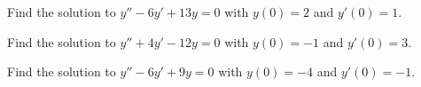 \documentclass{ximera}
\begin{document}
\begin{exercise}
    Find the solution to $y'' - 6y' + 13y = 0$ with $y(0) = 2$ and $y'(0) = 1$. 
\end{exercise}

\begin{exercise}
    Find the solution to $y'' + 4y' - 12y = 0$ with $y(0) = -1$ and $y'(0) = 3$. 
\end{exercise}

\begin{exercise}
    Find the solution to $y'' - 6y' + 9y = 0$ with $y(0) = -4$ and $y'(0) = -1$. 
\end{exercise}
\end{document}
